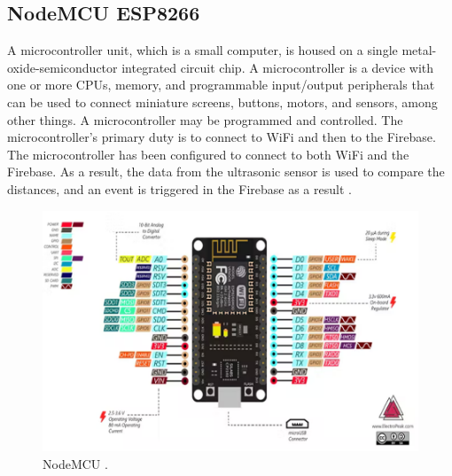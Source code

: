 \subsection{NodeMCU ESP8266}
A microcontroller unit, which is a small computer, is housed on a single metal-oxide-semiconductor integrated circuit chip. A microcontroller is a device with one or more CPUs, memory, and programmable input/output peripherals that can be used to connect miniature screens, buttons, motors, and sensors, among other things. A microcontroller may be programmed and controlled. The microcontroller's primary duty is to connect to WiFi and then to the Firebase. The microcontroller has been configured to connect to both WiFi and the Firebase. As a result, the data from the ultrasonic sensor is used to compare the distances, and an event is triggered in the Firebase as a result \cite{Shakthidhar2019}.
\begin{figure}[htp]
    \centering
    \includegraphics[width=12cm]{image/NodeMCU.png}
    \caption{NodeMCU \cite{NodeMCUIMG}.}
    \label{fig:NodeMCU}
\end{figure}

